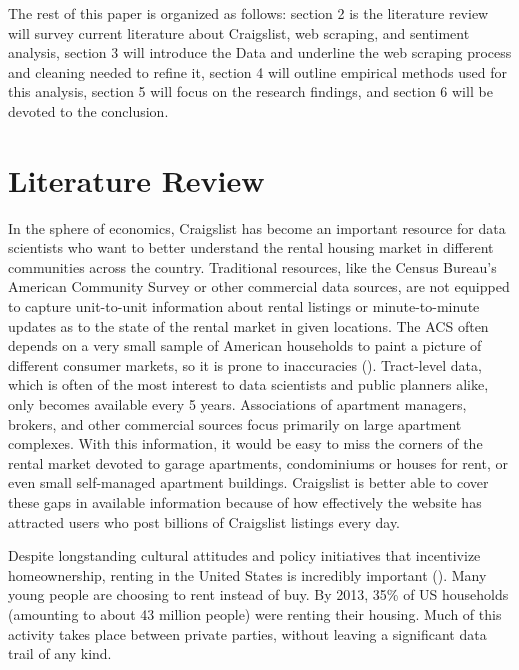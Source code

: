 \documentclass[12pt,english]{article}
\begin{document}
The rest of this paper is organized as follows: section 2 is the literature review will survey current literature about Craigslist, web scraping, and sentiment analysis, section 3 will introduce the Data and underline the web scraping process and cleaning needed to refine it, section 4 will outline empirical methods used for this analysis, section 5 will focus on the research findings, and section 6 will be devoted to the conclusion. 


\section{Literature Review}\label{sec:litreview}

In the sphere of economics, Craigslist has become an important resource for data scientists who want to better understand the rental housing market in different communities across the country. Traditional resources, like the Census Bureau’s American Community Survey or other commercial data sources, are not equipped to capture unit-to-unit information about rental listings or minute-to-minute updates as to the state of the rental market in given locations. The ACS often depends on a very small sample of American households to paint a picture of different consumer markets, so it is prone to inaccuracies (\citet{Boeing2017}). Tract-level data, which is often of the most interest to data scientists and public planners alike, only becomes available every 5 years. Associations of apartment managers, brokers, and other commercial sources focus primarily on large apartment complexes. With this information, it would be easy to miss the corners of the rental market devoted to garage apartments, condominiums or houses for rent,  or even small self-managed apartment buildings. Craigslist is better able to cover these gaps in available information because of how effectively the website has attracted users who post billions of Craigslist listings every day. 

Despite longstanding cultural attitudes and policy initiatives that incentivize homeownership, renting in the United States is incredibly important (\citet{Boeing2017}). Many young people are choosing to rent instead of buy. By 2013, 35\% of US households (amounting to about 43 million people) were renting their housing. Much of this activity takes place between private parties, without leaving a significant data trail of any kind. 
\end{document}
